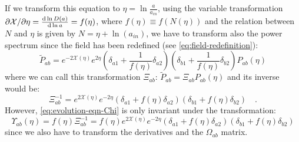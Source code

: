 If we transform this equation to $\eta=\ln\frac{a}{a_{in}}$, using
the variable transformation $\partial\mathcal{X}/\partial\eta=\frac{\mathrm{d}\ln D(a)}{\mathrm{d}\ln a}=f(\eta)$,
where $f(\eta)\equiv f(N(\eta))$ and the relation between $N$ and
$\eta$ is given by $N=\eta+\ln(a_{in})$, we have to transform also
the power spectrum since the field has been redefined (see \cref{eq:field-redefinition}):
\begin{equation}
\tilde{P}_{ab}=e^{-2\mathcal{X}(\eta)}e^{2\eta}(\delta_{a1}+\frac{1}{f(\eta)}\delta_{a2})(\delta_{b1}+\frac{1}{f(\eta)}\delta_{b2})P_{ab}(\eta)\label{eq:PS-transformation}
\end{equation}
where we can call this transformation $\varXi_{ab}$: 
\beeqc$ 
\tilde{P}_{ab}=\varXi_{ab}P_{ab}(\eta)
$
and its inverse would be: 
\begin{equation}
\varXi_{ab}^{-1}=e^{2\mathcal{X}(\eta)}e^{-2\eta}(\delta_{a1}+f(\eta)\delta_{a2})(\delta_{b1}+f(\eta)\delta_{b2}) \quad .
\end{equation}
However, \cref{eq:evolution-eqn-Chi} is only invariant under
the transformation:
\begin{equation}
\varUpsilon_{ab}(\eta)=f(\eta)\varXi_{ab}^{-1}=f(\eta)e^{2\mathcal{X}(\eta)}e^{-2\eta}(\delta_{a1}+f(\eta)\delta_{a2})(\delta_{b1}+f(\eta)\delta_{b2})
\end{equation}
since we also have to transform the derivatives and the $\Omega_{ab}$
matrix.

